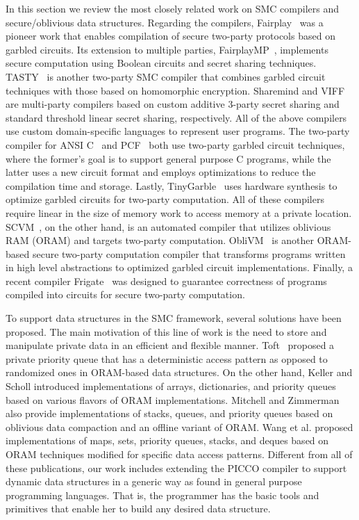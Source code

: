 \documentclass[11pt]{article}
\begin{document}
In this section we review the most closely related work on SMC compilers and
secure/oblivious data structures. Regarding the compilers,
Fairplay~\cite{Malkhi04} was a pioneer work that enables compilation of
secure two-party protocols based on garbled circuits. Its extension to
multiple parties, FairplayMP~\cite{Ben08}, implements secure computation
using Boolean circuits and secret sharing techniques. TASTY~\cite{Henecka10}
is another two-party SMC compiler that combines garbled circuit techniques
with those based on homomorphic encryption. Sharemind \cite{Bogdanov08} and
VIFF~\cite{Damgaard09} are multi-party compilers based on custom additive
3-party secret sharing and standard threshold linear secret sharing,
respectively. All of the above compilers use custom domain-specific
languages to represent user programs. The two-party compiler for ANSI
C~\cite{hol12} and PCF~\cite{Kreuter13} both use two-party garbled circuit
techniques, where the former's goal is to support general purpose C
programs, while the latter uses a new circuit format and employs
optimizations to reduce the compilation time and storage. Lastly,
TinyGarble~\cite{son15} uses hardware synthesis to optimize garbled circuits
for two-party computation. All of these compilers require linear in the size
of memory work to access memory at a private location. SCVM~\cite{Liu14}, on
the other hand, is an automated compiler that utilizes oblivious RAM (ORAM)
and targets two-party computation. ObliVM~\cite{Liu15} is another ORAM-based
secure two-party computation compiler that transforms programs written in
high level abstractions to optimized garbled circuit implementations.
Finally, a recent compiler Frigate~\cite{moo16} was designed to guarantee
correctness of programs compiled into circuits for secure two-party
computation.

To support data structures in the SMC framework, several solutions
\cite{Toft11,Keller14,Mitchell14,Wang14} have been proposed. The main
motivation of this line of work is the need to store and manipulate
private data in an efficient and flexible manner. Toft~\cite{Toft11}
proposed a private priority queue that has a deterministic access
pattern as opposed to randomized ones in ORAM-based data structures. 
On the other hand, Keller and Scholl \cite{Keller14} introduced
implementations of arrays, dictionaries, and priority queues based on
various flavors of ORAM implementations. Mitchell and Zimmerman
\cite{Mitchell14} also provide implementations of stacks, queues, and
priority queues based on oblivious data compaction and an offline
variant of ORAM. Wang et al. \cite{Wang14} proposed implementations of
maps, sets, priority queues, stacks, and deques based on ORAM
techniques modified for specific data access patterns. Different from
all of these publications, our work includes extending the PICCO
compiler to support dynamic data structures in a generic way as found
in general purpose programming languages. That is, the programmer has
the basic tools and primitives that enable her to build any desired
data structure.
\end{document}
